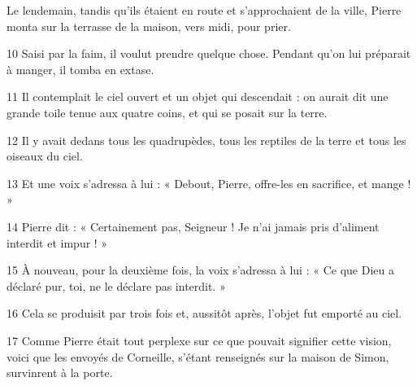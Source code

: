 Le lendemain, tandis qu’ils étaient en route et s’approchaient de la ville, Pierre monta sur la terrasse de la maison, vers midi, pour prier.

10 Saisi par la faim, il voulut prendre quelque chose. Pendant qu’on lui préparait à manger, il tomba en extase.

11 Il contemplait le ciel ouvert et un objet qui descendait : on aurait dit une grande toile tenue aux quatre coins, et qui se posait sur la terre.

12 Il y avait dedans tous les quadrupèdes, tous les reptiles de la terre et tous les oiseaux du ciel.

13 Et une voix s’adressa à lui : « Debout, Pierre, offre-les en sacrifice, et mange ! »

14 Pierre dit : « Certainement pas, Seigneur ! Je n’ai jamais pris d’aliment interdit et impur ! »

15 À nouveau, pour la deuxième fois, la voix s’adressa à lui : « Ce que Dieu a déclaré pur, toi, ne le déclare pas interdit. »

16 Cela se produisit par trois fois et, aussitôt après, l’objet fut emporté au ciel.

17 Comme Pierre était tout perplexe sur ce que pouvait signifier cette vision, voici que les envoyés de Corneille, s’étant renseignés sur la maison de Simon, survinrent à la porte.